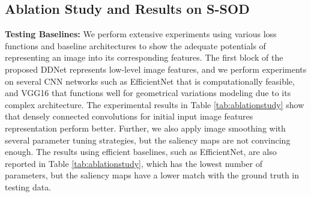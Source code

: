 \documentclass{article}
\begin{document}
\begin{table}[tbp]
\caption{Ablation study over SIP dataset using various loss functions and baseline architectures.}
\captionsetup{justification=centering}
\label{tab:ablationstudy}
\end{table}
\subsection{Ablation Study and Results on S-SOD}
\label{ss:ablation_S-SODresults}
\textbf{Testing Baselines:} We perform extensive experiments using various loss functions and baseline architectures to show the adequate potentials of representing an image into its corresponding features. The first block of the proposed DDNet represents low-level image features, and we perform experiments on several CNN networks such as EfficientNet that is computationally feasible, and VGG16 that functions well for geometrical variations modeling due to its complex architecture. The experimental results in Table \ref{tab:ablationstudy} show that densely connected convolutions for initial input image features representation perform better. Further, we also apply image smoothing with several parameter tuning strategies, but the saliency maps are not convincing enough. The results using efficient baselines, such as EfficientNet, are also reported in Table \ref{tab:ablationstudy}, which has the lowest number of parameters, but the saliency maps have a lower match with the ground truth in testing data.
\end{document}
